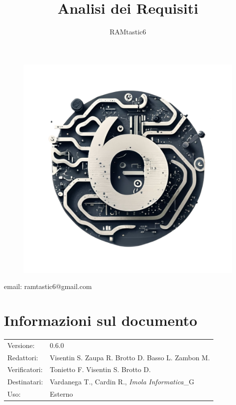 \documentclass[12pt, oneside]{article}
\author{RAMtastic6}
\begin{document}
\thispagestyle{empty}
\title{Analisi dei Requisiti}
\maketitle
\begin{figure}[h]
  \centering
  \includegraphics[scale=0.3]{logo.png}
\end{figure}
\begin{center}
    email: ramtastic6@gmail.com
\end{center}

\section*{Informazioni sul documento} 
\begin{tabular}{ll}
Versione: & 0.6.0 \\
Redattori: &  Visentin S.  Zaupa R. Brotto D. Basso L. Zambon M. \\ 
Verificatori: & Tonietto F. Visentin S. Brotto D. \\
Destinatari: & Vardanega T., Cardin R., \textit{Imola Informatica}_G \\
Uso: & Esterno
\end{tabular}
\newpage
\end{document}
